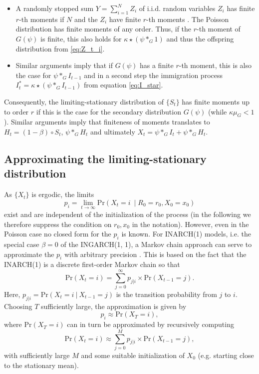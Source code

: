 \documentclass{article}
\begin{document}
\begin{itemize}
\item A randomly stopped sum $Y = \sum_{i = 1}^N Z_i$ of i.i.d. random variables $Z_i$ has finite $r$-th moments if $N$ and the $Z_i$ have finite $r$-th moments \cite[Theorem 5.2]{Gut2009}. The Poisson distribution has finite moments of any order. Thus, if the $r$-th moment of $G(\psi)$ is finite, this also holds for $\kappa \star (\psi *_G 1)$ and thus the offspring distribution from \eqref{eq:Z_t_i}.
\item Similar arguments imply that if $G(\psi)$ has a finite $r$-th moment, this is also the case for $\psi *_G I_{t - 1}$ and in a second step the immigration process $I^*_t = \kappa \star(\psi *_G I_{t - 1})$ from equation \eqref{eq:I_star}.
\end{itemize}
Consequently, the limiting-stationary distribution of $\{S_t\}$ has finite moments up to order $r$ if this is the case for the secondary distribution $G(\psi)$ (while $\kappa\mu_G < 1$). Similar arguments imply that finiteness of moments translates to $H_t = (1 - \beta) \circ S_t$, $\psi *_G H_t$ and ultimately $X_t = \psi *_G I_t + \psi *_G H_t$.
%
%

\subsection{Approximating the limiting-stationary distribution}

As $\{X_t\}$ is ergodic, the limits %
$$
p_i = \lim_{t \rightarrow \infty} \text{Pr}(X_t = i \ \mid R_0 = r_0, X_0 = x_0)
$$
exist and are independent of the initialization of the process (in the following we therefore suppress the condition on $r_0, x_0$ in the notation). However, even in the Poisson case no closed form for the $p_i$ is known. For INARCH(1) models, i.e. the special case $\beta = 0$ of the INGARCH(1, 1), a Markov chain approach can serve to approximate the $p_i$ with arbitrary precision \cite{Weiss2010}. This is based on the fact that the INARCH(1) is a discrete first-order Markov chain so that
$$
\text{Pr}(X_t = i) = \sum_{j = 0}^\infty p_{j|i} \times \text{Pr}(X_{t - 1} = j).
$$
Here, $p_{j|i} = \text{Pr}(X_t = i \ | \ X_{t - 1} = j) $ is the transition probability from $j$ to $i$. Choosing $T$ sufficiently large, the approximation is given by
$$
p_i \approx \text{Pr}(X_T = i),
$$
where $\text{Pr}(X_T = i)$ can in turn be approximated by recursively computing
$$
\text{Pr}(X_t = i) \approx \sum_{j = 0}^M p_{j|i} \times \text{Pr}(X_{t - 1} = j),
$$
with sufficiently large $M$ and some suitable initialization of $X_0$ (e.g. starting close to the stationary mean).
\end{document}
